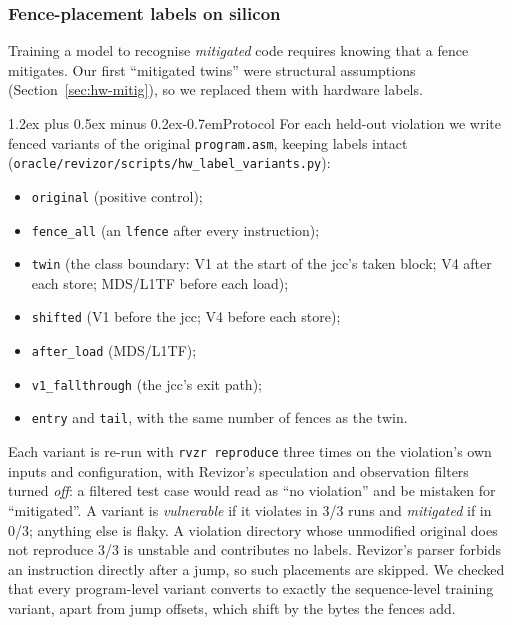 \documentclass[conference]{IEEEtran}
\makeatletter
\renewcommand\paragraph{\@startsection{paragraph}{4}{\z@}%
  {1.2ex plus 0.5ex minus 0.2ex}{-0.7em}{\normalfont\normalsize\bfseries}}
\makeatother
\begin{document}
\subsubsection{Fence-placement labels on silicon}
\label{sec:hwlabel}

Training a model to recognise \emph{mitigated} code requires knowing that a
fence mitigates. Our first ``mitigated twins'' were structural assumptions
(Section~\ref{sec:hw-mitig}), so we replaced them with hardware labels.

\paragraph{Protocol}
For each held-out violation we write fenced variants of the original
\texttt{program.asm}, keeping labels intact
(\texttt{oracle/revizor/scripts/\allowbreak hw\_label\_variants.py}):
\begin{itemize}[itemsep=0pt,leftmargin=1.2em]
  \item \texttt{original} (positive control);
  \item \texttt{fence\_all} (an \texttt{lfence} after every instruction);
  \item \texttt{twin} (the class boundary: V1 at the start of the jcc's taken
    block; V4 after each store; MDS/L1TF before each load);
  \item \texttt{shifted} (V1 before the jcc; V4 before each store);
  \item \texttt{after\_load} (MDS/L1TF);
  \item \texttt{v1\_fallthrough} (the jcc's exit path);
  \item \texttt{entry} and \texttt{tail}, with the same number of fences as
    the twin.
\end{itemize}
Each variant is re-run with \texttt{rvzr reproduce} three times on the
violation's own inputs and configuration, with Revizor's speculation and
observation filters turned \emph{off}: a filtered test case would read as ``no
violation'' and be mistaken for ``mitigated''. A variant is \emph{vulnerable}
if it violates in 3/3 runs and \emph{mitigated} if in 0/3; anything else is
flaky. A violation directory whose unmodified original does not reproduce 3/3
is unstable and contributes no labels. Revizor's parser forbids an instruction
directly after a jump, so such placements are skipped. We checked that every
program-level variant converts to exactly the sequence-level training variant,
apart from jump offsets, which shift by the bytes the fences add.
\end{document}

